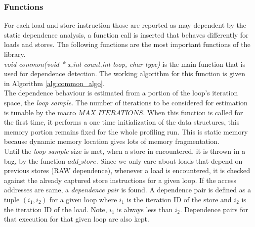 \documentclass[10pt]{report}          %
\begin{document}
\subsubsection{Functions}

For each load and store instruction those are reported as may dependent by the static dependence analysis, a function call is inserted that behaves differently for loads and stores.  The following functions are the most important functions of the library. \\   


\textit{void common(void * x,int count,int loop, char type)} is the main function that is used for dependence detection.  The working algorithm for this function is given in Algorithm \ref{alg:common_algo}. \\

The dependence behaviour is estimated from a portion of the loop's iteration space, the \textit{loop sample}.  The number of iterations to be considered for estimation is tunable by the macro $MAX\_ITERATIONS$.  When this function is called for the first time, it performs a one time initialization of the data structures, this memory portion remains fixed for the whole profiling run.  This is static memory because dynamic memory location gives lots of memory fragmentation. \\

Until the \textit{loop sample} size is met, when a store in encountered, it is thrown in a bag, by the function $add\_store$.  Since we only care about loads that depend on previous stores (RAW dependence), whenever a load is encountered, it is checked against the already captured store instructions for a given loop.  If the access addresses are same, a \textit{dependence pair} is found.  A dependence pair is defined as a tuple $(i_1,i_2)$ for a given loop where $i_1$ is the iteration ID of the store and $i_2$ is the iteration ID of the load. Note, $i_1$ is always less than $i_2$. Dependence pairs for that execution for that given loop are also kept.\\
\end{document}
